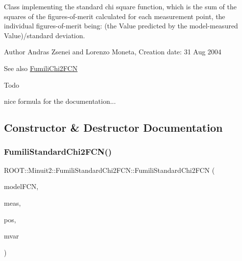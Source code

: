 Class implementing the standard chi square function, which is the sum of the squares of the figures-\/of-\/merit calculated for each measurement point, the individual figures-\/of-\/merit being\+: (the Value predicted by the model-\/measured Value)/standard deviation.

\begin{DoxyAuthor}{Author}
Andras Zsenei and Lorenzo Moneta, Creation date\+: 31 Aug 2004
\end{DoxyAuthor}
\begin{DoxySeeAlso}{See also}
\mbox{\hyperlink{classROOT_1_1Minuit2_1_1FumiliChi2FCN}{Fumili\+Chi2\+F\+CN}}
\end{DoxySeeAlso}
\begin{DoxyRefDesc}{Todo}
\item[\mbox{\hyperlink{todo__todo000033}{Todo}}]nice formula for the documentation...\end{DoxyRefDesc}


\subsection{Constructor \& Destructor Documentation}
\mbox{\label{classROOT_1_1Minuit2_1_1FumiliStandardChi2FCN_a1b86269a64b1368ac6d33de89f32674d}} 
\subsubsection{\texorpdfstring{FumiliStandardChi2FCN()}{FumiliStandardChi2FCN()}\hspace{0.1cm}{\footnotesize\ttfamily [1/6]}}
{\footnotesize\ttfamily R\+O\+O\+T\+::\+Minuit2\+::\+Fumili\+Standard\+Chi2\+F\+C\+N\+::\+Fumili\+Standard\+Chi2\+F\+CN (\begin{DoxyParamCaption}\item[{const \mbox{\hyperlink{classROOT_1_1Minuit2_1_1ParametricFunction}{Parametric\+Function}} \&}]{model\+F\+CN,  }\item[{const std\+::vector$<$ double $>$ \&}]{meas,  }\item[{const std\+::vector$<$ double $>$ \&}]{pos,  }\item[{const std\+::vector$<$ double $>$ \&}]{mvar }\end{DoxyParamCaption})\hspace{0.3cm}{\ttfamily [inline]}}

